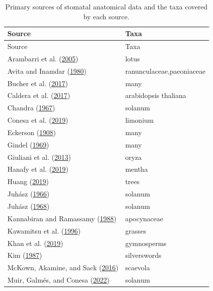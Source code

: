 \documentclass[
  12pt,
]{article}
\begin{document}
\begin{longtable}[]{@{}ll@{}}
\caption{\label{tab:sources}Primary sources of stomatal anatomical data and the taxa covered by each source.}\tabularnewline
\toprule
Source & Taxa \\
\midrule
\endfirsthead
\toprule
Source & Taxa \\
\midrule
\endhead
Arambarri et al. (\protect\hyperlink{ref-arambarri_taxonomy_2005}{2005}) & lotus \\
Avita and Inamdar (\protect\hyperlink{ref-avita_structure_1980}{1980}) & ranunculaceae,paeoniaceae \\
Bucher et al. (\protect\hyperlink{ref-bucher_stomatal_2017}{2017}) & many \\
Caldera et al. (\protect\hyperlink{ref-caldera_effects_2017}{2017}) & arabidopsis thaliana \\
Chandra (\protect\hyperlink{ref-chandra_epidermal_1967}{1967}) & solanum \\
Conesa et al. (\protect\hyperlink{ref-conesa_stomatal_2019}{2019}) & limonium \\
Eckerson (\protect\hyperlink{ref-eckerson_number_1908}{1908}) & many \\
Gindel (\protect\hyperlink{ref-gindel_stomatal_1969}{1969}) & many \\
Giuliani et al. (\protect\hyperlink{ref-giuliani_coordination_2013}{2013}) & oryza \\
Hanafy et al. (\protect\hyperlink{ref-hanafy_leaf_2019}{2019}) & mentha \\
Huang (\protect\hyperlink{ref-huang_leaf_2019}{2019}) & trees \\
Juhász (\protect\hyperlink{ref-juhasz_effect_1966}{1966}) & solanum \\
Juhász (\protect\hyperlink{ref-juhasz_comparative_1968}{1968}) & solanum \\
Kannabiran and Ramassamy (\protect\hyperlink{ref-kannabiran_foliar_1988}{1988}) & apocynaceae \\
Kawamitsu et al. (\protect\hyperlink{ref-kawamitsu_stomatal_1996}{1996}) & grasses \\
Khan et al. (\protect\hyperlink{ref-khan_taxonomic_2019}{2019}) & gymnosperms \\
Kim (\protect\hyperlink{ref-kim_comparative_1987}{1987}) & silverswords \\
McKown, Akamine, and Sack (\protect\hyperlink{ref-mckown_trait_2016}{2016}) & scaevola \\
Muir, Galmés, and Conesa (\protect\hyperlink{ref-muir_unpublished_2022}{2022}) & solanum \\

\end{longtable}
\end{document}
